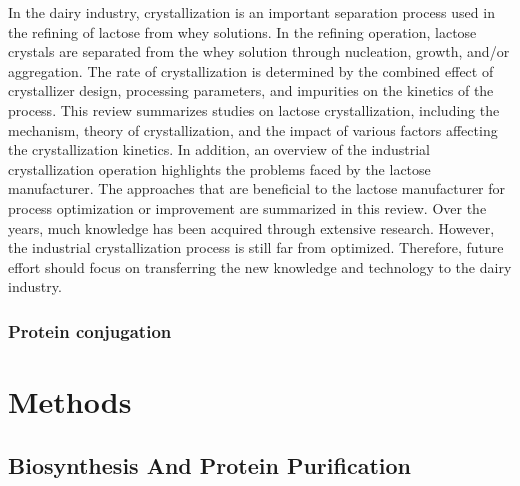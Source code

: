 \begin{refsection}
In the dairy industry, crystallization is an important separation
process used in the refining of lactose from whey solutions. In the refining
operation, lactose crystals are separated from the whey solution through
nucleation, growth, and/or aggregation. The rate of crystallization is
determined by the combined effect of crystallizer design, processing
parameters, and impurities on the kinetics of the process. This review
summarizes studies on lactose crystallization, including the mechanism, theory
of crystallization, and the impact of various factors affecting the
crystallization kinetics. In addition, an overview of the industrial
crystallization operation highlights the problems faced by the lactose
manufacturer. The approaches that are beneficial to the lactose manufacturer
for process optimization or improvement are summarized in this review. Over the
years, much knowledge has been acquired through extensive research. However,
the industrial crystallization process is still far from optimized. Therefore,
future effort should focus on transferring the new knowledge and technology to
the dairy industry.

\subsubsection{Protein conjugation}


\section{Methods}

\subsection{Biosynthesis And Protein Purification}


\end{refsection}
